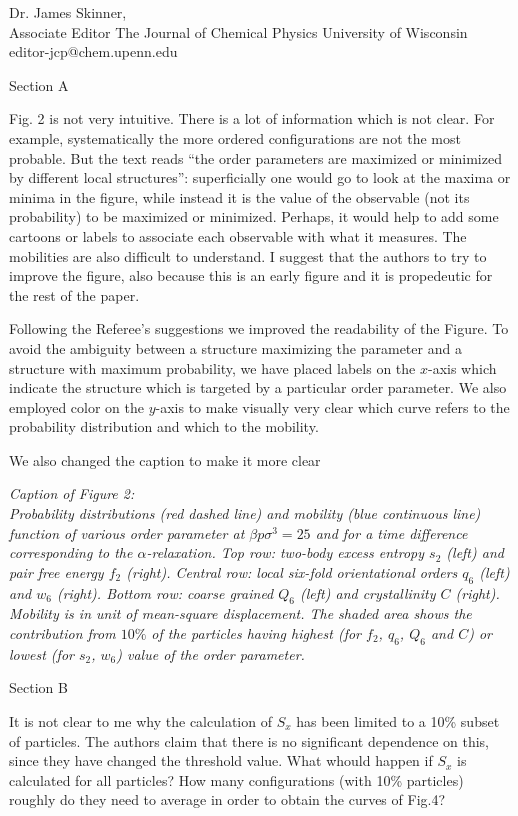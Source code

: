 \documentclass[a4paper, rebuttal, parskip=true, firsthead=false, fromemail=false, foldmarks=false]{scrlttr2}
\begin{document}
\begin{letter}{Dr. James Skinner,\\Associate Editor
The Journal of Chemical Physics
University of Wisconsin\\
editor-jcp@chem.upenn.edu }
\begin{quotationi}
Section A

Fig. 2 is not very intuitive. There is a lot of information which is not clear. For example, systematically the more ordered configurations are not the most probable. But the text reads ``the order parameters are maximized or minimized by different local structures'': superficially one would go to look at the maxima or minima in the figure, while instead it is the value of the observable (not its probability) to be maximized or minimized. Perhaps, it would help to add some cartoons or labels to associate each observable with what it measures. The mobilities are also difficult to understand. I suggest that the authors to try to improve the figure, also because this is an early figure and it is propedeutic for the rest of the paper.
\end{quotationi}

Following the Referee's suggestions we improved the readability of the Figure. To avoid the ambiguity between a structure maximizing the parameter and a structure with maximum probability, we have placed labels on the $x$-axis which indicate the structure which is targeted by a particular order parameter.
We also employed color on the $y$-axis to make visually very clear which curve refers to the probability distribution and which to the mobility.

We also changed the caption to make it more clear

{\it Caption of Figure 2:\\
Probability distributions (red dashed line) and mobility (blue continuous line) function of various order parameter at $\beta p\sigma^3=25$ and for a time difference corresponding to the $\alpha$-relaxation. Top row: two-body excess entropy $s_2$ (left) and pair free energy $f_2$ (right). Central row: local six-fold orientational orders $q_6$ (left) and $w_6$ (right). Bottom row: coarse grained $Q_6$ (left) and crystallinity $C$ (right). Mobility is in unit of mean-square displacement. The shaded area shows the contribution from $10\%$ of the particles having highest (for $f_2$, $q_6$, $Q_6$ and $C$) or lowest (for $s_2$, $w_6$) value of the order parameter.
}


\begin{quotationi}
Section B

It is not clear to me why the calculation of $S_x$ has been limited to a 10\% subset of particles. The authors claim that there is no significant dependence on this, since they have changed the threshold value. What whould happen if $S_x$ is calculated for all particles? How many configurations (with 10\% particles) roughly do they need to average in order to obtain the curves of Fig.4?
\end{quotationi}


\end{letter}
\end{document}
